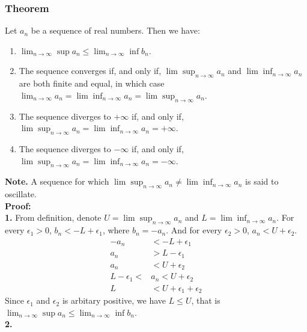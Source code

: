\documentclass{article}
\begin{document}
\subsubsection{Theorem}
Let $a_{n}$ be a sequence of real numbers. Then we have:
\begin{enumerate}
    \item $\lim_{n\rightarrow \infty}\sup a_{n}\leq\lim_{n\rightarrow \infty}\inf b_{n}$.
    \item The sequence converges if, and only if, $\lim\sup_{n\rightarrow \infty}a_{n}$ and 
    $\lim\inf_{n\rightarrow \infty}a_{n}$ are both finite and equal, in which case 
    $\lim_{n\rightarrow \infty}a_{n}=\lim\inf_{n\rightarrow \infty}a_{n}=\lim\sup_{n\rightarrow \infty}a_{n}$.
    \item The sequence diverges to $+\infty$ if, and only if, $\lim\sup_{n\rightarrow \infty}a_{n}=\lim\inf_{n\rightarrow \infty}a_{n}=+\infty$.
    \item The sequence diverges to $-\infty$ if, and only if, $\lim\sup_{n\rightarrow \infty}a_{n}=\lim\inf_{n\rightarrow \infty}a_{n}=-\infty$.
\end{enumerate}
\textbf{Note.} A sequence for which $\lim\sup_{n\rightarrow \infty}a_{n}\neq\lim\inf_{n\rightarrow \infty}a_{n} $ is said to oscillate.\\
\textbf{Proof:}\\
\textbf{1.}
From definition, denote $U=\lim\sup_{n\rightarrow \infty}a_{n}$ and $L=\lim\inf_{n\rightarrow \infty}a_{n}$.
For every $\epsilon_{1}>0$, $b_{n}<-L+\epsilon_{1}$, where $b_{n}=-a_{n}$. And for every $\epsilon_{2}>0$, $a_{n}<U+\epsilon_{2}$.
\begin{align*}
    -a_{n} &< -L + \epsilon_{1} \\
    a_{n} &> L - \epsilon_{1} \\
    a_{n} &< U + \epsilon_{2} \\
    L - \epsilon_{1} < &a_{n} < U + \epsilon_{2} \\
    L &< U + \epsilon_{1} + \epsilon_{2}
\end{align*}
Since $\epsilon_{1}$ and $\epsilon_{2}$ is arbitary positive, 
we have $L\leq U$, that is $\lim_{n\rightarrow \infty}\sup a_{n}\leq\lim_{n\rightarrow \infty}\inf b_{n}$.\\
\textbf{2.} 
\end{document}

